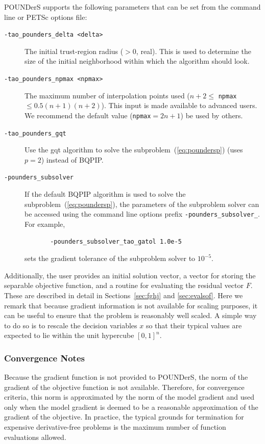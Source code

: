 \documentclass[]{book}
\begin{document}
POUNDerS supports the following parameters that can be set from the
command line or PETSc options file:
\begin{description}
  \item[\texttt{-tao\_pounders\_delta <delta>}] The initial trust-region 
  radius ($>0$, real).
  This is  used to determine the size of the initial neighborhood within
  which the algorithm should look. 
  
  \item[\texttt{-tao\_pounders\_npmax <npmax>}] The maximum number of 
  interpolation points used
  ($n+2\leq$ \texttt{npmax} $\leq 0.5(n+1)(n+2)$). This input is made
  available to advanced users. We recommend the default
  value (\texttt{npmax}$=2n+1$) be used by others.

  \item[\texttt{-tao\_pounders\_gqt}] Use the gqt algorithm to solve the
  subproblem~(\ref{eq:poundersp}) (uses $p=2$) instead of BQPIP.

  \item[\texttt{-pounders\_subsolver}] If the default
BQPIP algorithm is used to solve the 
  subproblem~(\ref{eq:poundersp}), the parameters of the subproblem solver
  can be accessed using the command line options  prefix
\texttt{-pounders\_subsolver\_}.  For example, 
\begin{verbatim}
       -pounders_subsolver_tao_gatol 1.0e-5
\end{verbatim}  
sets the gradient tolerance of the subproblem solver to $10^{-5}$.
\end{description}

Additionally,  the user provides an initial solution vector, a vector for
storing
the separable objective function, and a routine for evaluating the residual
vector $F$.  These are described in detail in 
Sections~\ref{sec:fghj} and \ref{sec:evalsof}. 
Here we remark that because gradient information is not available for
scaling purposes, it can be useful to ensure that the problem is
reasonably well scaled. A simple way to do so is to rescale the
decision variables $x$ so that their typical values are expected to lie
within the unit hypercube $[0,1]^n$.

\subsubsection{Convergence Notes}
Because the gradient function is not provided to POUNDerS, 
the norm of the gradient of the objective function is not available.
Therefore, 
for convergence criteria, this norm is approximated by the norm of the
model gradient and used only when the model gradient is deemed to be a
reasonable approximation of the gradient of the objective. In practice, the
typical grounds for termination for expensive derivative-free problems is
the maximum number of function evaluations allowed. 
\end{document}
